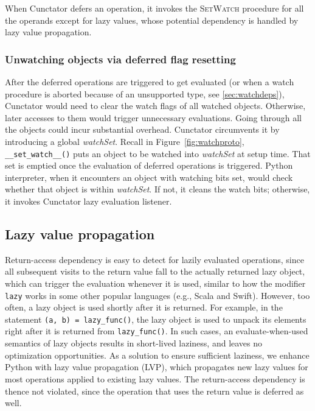 \documentclass[sigconf]{acmart}\settopmatter{printfolios=true,printccs=false,printacmref=false}\setcopyright{none}
\begin{document}
When Cunctator defers an operation, it invokes the \textsc{SetWatch} procedure for all the operands except for lazy values, whose potential dependency is handled by lazy value propagation. 


\subsubsection{Unwatching objects via deferred flag resetting}
\label{sec:unwatch}
After the deferred operations are triggered to get evaluated (or when a watch procedure is aborted because of an unsupported type, see \cref{sec:watchdeps}), Cunctator would need to clear the watch flags of all watched objects. Otherwise, later accesses to them would trigger unnecessary evaluations. Going through all the objects could incur substantial overhead. Cunctator circumvents it by introducing a global {\em watchSet}. Recall in Figure~\ref{fig:watchproto}, \texttt{\_\_set\_watch\_\_()} puts an object to be watched into {\em watchSet} at setup time. That set is emptied once the evaluation of deferred operations is triggered. Python interpreter, when it encounters an object with watching bits set, would check whether that object is within {\em watchSet}. If not, it cleans the watch bits; otherwise, it invokes Cunctator lazy evaluation listener. 


\subsection{Lazy value propagation}
\label{sec:lvp}

Return-access dependency is easy to detect for lazily evaluated operations, since all subsequent visits to the return value fall to the actually returned lazy object, which can trigger the evaluation whenever it is used, similar to how the modifier \texttt{lazy} works in some other popular languages (e.g., Scala and Swift). However, too often, a lazy object is used shortly after it is returned. For example, in the statement \texttt{(a, b) = lazy\_func()}, the lazy object is used to unpack its elements right after it is returned from \texttt{lazy\_func()}. In such cases, an evaluate-when-used semantics of lazy objects results in short-lived laziness, and leaves no optimization opportunities. As a solution to ensure sufficient laziness, we enhance Python with lazy value propagation (LVP), which propagates new lazy values for most operations applied to existing lazy values. The return-access dependency is thence not violated, since the operation that uses the return value is deferred as well.
\end{document}
